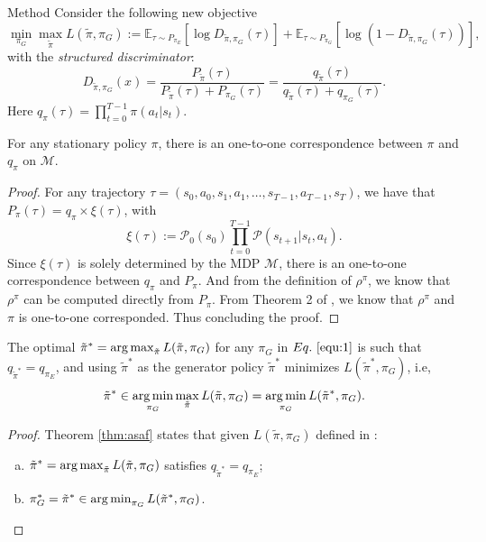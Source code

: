 \documentclass[10pt,aspectratio=169]{beamer}
\begin{document}
\begin{frame}{Method}
	Consider the following new objective
	\begin{equation}\label{equ:1}
		\min_{\pi_G}\max_{\tilde{\pi}} L(\tilde{\pi}, \pi_G) := \mathbb{E}_{\tau\sim P_{\pi_E}}\left[\log D_{\tilde{\pi}, \pi_G}(\tau)\right] + \mathbb{E}_{\tau\sim P_{\pi_G}}\left[\log (1-D_{\tilde{\pi}, \pi_G}(\tau))\right],
	\end{equation}
	with the \textit{structured discriminator}:
	\[
		D_{\tilde{\pi}, \pi_G}(x) = \frac{P_{\tilde{\pi}}(\tau)}{P_{\tilde{\pi}}(\tau) + P_{\pi_G}(\tau)} = \frac{q_{\tilde{\pi}}(\tau)}{q_{\tilde{\pi}}(\tau) + q_{\pi_G}(\tau)}.
	\]
	Here $q_\pi(\tau)=\prod_{t=0}^{T-1}\pi(a_t|s_t)$.
	\begin{lemma}\label{lem:corp}
		For any stationary policy $\pi$, there is an one-to-one correspondence between $\pi$ and $q_\pi$ on $\mathcal{M}$.
	\end{lemma}
	\begin{proof}
		For any trajectory $\tau = (s_0, a_0, s_1, a_1, \ldots, s_{T-1}, a_{T-1}, s_T)$, we have that $P_\pi(\tau) = q_\pi \times \xi(\tau)$, with
		\[\xi(\tau) := \mathcal{P}_0(s_0)\prod_{t=0}^{T-1}\mathcal{P}(s_{t+1}|s_t, a_t).\]
		Since $\xi(\tau)$ is solely determined by the MDP $\mathcal{M}$, there is an one-to-one correspondence between $q_\pi$ and $P_\pi$. And from the definition of $\rho^\pi$, we know that $\rho^\pi$ can be computed directly from $P_\pi$. From Theorem 2 of \citep{syed2008apprenticeship}, we know that $\rho^\pi$ and $\pi$ is one-to-one corresponded. Thus concluding the proof.
	\end{proof}
	\begin{theorem}\label{thm:asaf}
		The optimal $\tilde{\pi}^* = \operatorname*{arg\,max}_{\tilde{\pi}}L(\tilde{\pi}, \pi_G)$ for any $\pi_G$ in $\myeqref{equ:1}$ is such that $q_{\tilde{\pi}^*} = q_{\pi_E}$, and using $\tilde{\pi}^*$ as the generator policy $\tilde{\pi}^*$ minimizes $L(\tilde{\pi}^*, \pi_G)$, i.e,
		\[\tilde{\pi}^* \in \operatorname*{arg\,min}_{\pi_G}\max_{\tilde{\pi}}L(\tilde{\pi}, \pi_G)=\operatorname*{arg\,min}_{\pi_G}L(\tilde{\pi}^*, \pi_G).\]
	\end{theorem}
	\begin{proof}
		Theorem \ref{thm:asaf} states that given $L(\tilde{\pi}, \pi_G)$ defined in :
		\begin{enumerate}[(a)]
			\item $\tilde{\pi}^* = \operatorname*{arg\,max}_{\tilde{\pi}} L(\tilde{\pi}, \pi_G)$ satisfies $q_{\tilde{\pi}^*} = q_{\pi_E}$;
			\item $\pi^*_G = \tilde{\pi}^* \in \operatorname*{arg\,min}_{\pi_G} L(\tilde{\pi}^*, \pi_G)$.

\end{enumerate}
\end{proof}
\end{frame}
\end{document}
